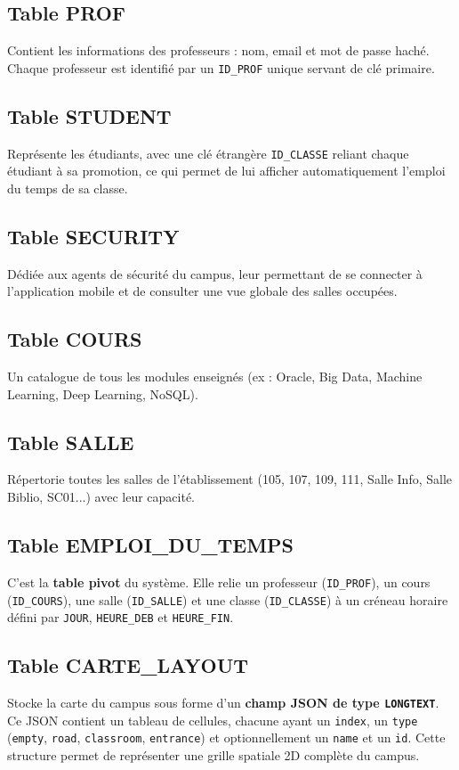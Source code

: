 \documentclass[12pt, a4paper]{report}
\begin{document}
\subsection{Table PROF}
Contient les informations des professeurs : nom, email et mot de passe haché. Chaque professeur est identifié par un \texttt{ID\_PROF} unique servant de clé primaire.

\subsection{Table STUDENT}
Représente les étudiants, avec une clé étrangère \texttt{ID\_CLASSE} reliant chaque étudiant à sa promotion, ce qui permet de lui afficher automatiquement l'emploi du temps de sa classe.

\subsection{Table SECURITY}
Dédiée aux agents de sécurité du campus, leur permettant de se connecter à l'application mobile et de consulter une vue globale des salles occupées.

\subsection{Table COURS}
Un catalogue de tous les modules enseignés (ex : Oracle, Big Data, Machine Learning, Deep Learning, NoSQL).

\subsection{Table SALLE}
Répertorie toutes les salles de l'établissement (105, 107, 109, 111, Salle Info, Salle Biblio, SC01...) avec leur capacité.

\subsection{Table EMPLOI\_DU\_TEMPS}
C'est la \textbf{table pivot} du système. Elle relie un professeur (\texttt{ID\_PROF}), un cours (\texttt{ID\_COURS}), une salle (\texttt{ID\_SALLE}) et une classe (\texttt{ID\_CLASSE}) à un créneau horaire défini par \texttt{JOUR}, \texttt{HEURE\_DEB} et \texttt{HEURE\_FIN}.

\subsection{Table CARTE\_LAYOUT}
Stocke la carte du campus sous forme d'un \textbf{champ JSON de type \texttt{LONGTEXT}}. Ce JSON contient un tableau de cellules, chacune ayant un \texttt{index}, un \texttt{type} (\texttt{empty}, \texttt{road}, \texttt{classroom}, \texttt{entrance}) et optionnellement un \texttt{name} et un \texttt{id}. Cette structure permet de représenter une grille spatiale 2D complète du campus.
\end{document}
